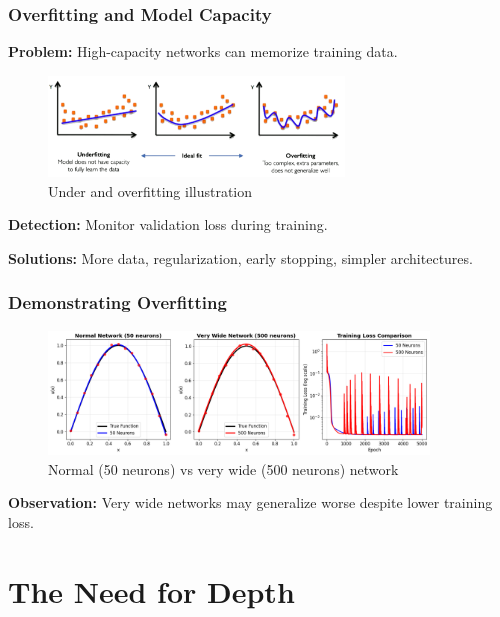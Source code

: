 \documentclass[notes]{beamer}
\begin{document}
\begin{frame}
\begin{frame}
\end{frame}

\begin{frame}
\frametitle{Overfitting and Model Capacity}

\textbf{Problem:} High-capacity networks can memorize training data.

\begin{figure}[ht]
	\centering
	\includegraphics[width=0.7\textwidth]{figs/overfitting.png}
	\caption*{Under and overfitting illustration}
\end{figure}

\textbf{Detection:} Monitor validation loss during training.

\textbf{Solutions:} More data, regularization, early stopping, simpler architectures.

\end{frame}

\begin{frame}
\frametitle{Demonstrating Overfitting}

\begin{figure}[ht]
	\centering
	\includegraphics[width=0.9\textwidth]{figs/overfitting-demo.png}
	\caption*{Normal (50 neurons) vs very wide (500 neurons) network}
\end{figure}

\textbf{Observation:} Very wide networks may generalize worse despite lower training loss.

\end{frame}

\section{The Need for Depth}


\end{frame}
\end{document}

